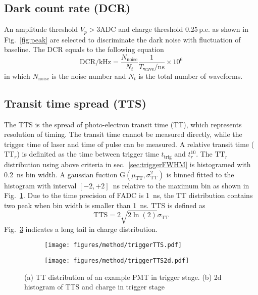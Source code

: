 \subsection{Dark count rate (DCR)}
An amplitude threshold $V_{p}>3\mathrm{ADC}$ and charge threshold 0.25\,p.e. as shown in Fig.~\ref{fig:peak} are selected to discriminate the dark noise with fluctuation of baseline. The DCR equals to the following equation
\begin{equation}
    \mathrm{DCR/kHz} = \frac{N_{\mathrm{noise}}}{N_{t}}\frac{1}{T_{\mathrm{wave}}/\mathrm{ns}}\times 10^{6}
\end{equation}
in which $N_{\mathrm{noise}}$ is the noise number and $N_{t}$ is the total number of waveforms.

\subsection{Transit time spread (TTS)}
The TTS is the spread of photo-electron transit time (TT), which represents resolution of timing. The transit time cannot be measured directly, while the trigger time of laser and time of pulse can be measured. A relative transit time ($\mathrm{TT}_r$) is definited as the time between trigger time $t_{\mathrm{trig}}$ and $t_r^{10}$. The $\mathrm{TT}_r$ distribution using above criteria in sec.~\ref{sec:triggerFWHM} is histogramed with \SI{0.2}{ns} bin width. A gaussian fuction G$(\mu_{\mathrm{TT}},\sigma_{\mathrm{TT}}^2)$ is binned fitted to the histogram with interval $[-2,+2]$\, ns relative to the maximum bin as shown in Fig.~\ref{fig:triggerTTS}. Due to the time precision of FADC is \SI{1}{ns}, the TT distribution contains two peak when bin width is smaller than \SI{1}{ns}. TTS is defined as
\begin{equation}
    \mathrm{TTS}=2\sqrt{2\ln(2)}\sigma_{\mathrm{TT}}
\end{equation}
Fig.~\ref{fig:triggerTTS2d} indicates a long tail in charge distribution.
\begin{figure}[!htbp]
    \centering
    \begin{subfigure}[t]{0.49\textwidth}
        \texttt{[image: figures/method/triggerTTS.pdf]}
        \caption{}
        \label{fig:triggerTTS}
    \end{subfigure}
    \begin{subfigure}[t]{0.49\textwidth}
        \texttt{[image: figures/method/triggerTTS2d.pdf]}
        \caption{}
        \label{fig:triggerTTS2d}
    \end{subfigure}
    \caption{(a) TT distribution of an example PMT in trigger stage. (b) 2d histogram of TTS and charge in trigger stage}
\end{figure}

